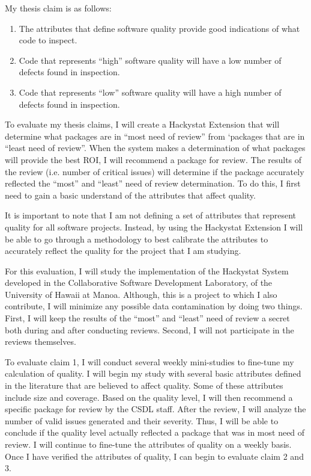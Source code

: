 \documentclass[11pt,twocolumn]{article}
\begin{document}
My thesis claim is as follows: 
\begin{enumerate}
\item The attributes that define software quality provide good indications
  of what code to inspect.
\item Code that represents ``high'' software quality will have a low number
  of defects found in inspection.
\item Code that represents ``low'' software quality will have a high number
  of defects found in inspection.
\end{enumerate}

\label{sec:evaluation}
To evaluate my thesis claims, I will create a Hackystat Extension that will
determine what packages are in ``most need of review'' from `packages that
are in ``least need of review''. When the system makes a determination of
what packages will provide the best ROI, I will recommend a package for
review. The results of the review (i.e. number of critical issues) will
determine if the package accurately reflected the ``most'' and ``least''
need of review determination.  To do this, I first need to gain a basic
understand of the attributes that affect quality.

It is important to note that I am not defining a set of attributes that
represent quality for all software projects. Instead, by using the
Hackystat Extension I will be able to go through a methodology to best
calibrate the attributes to accurately reflect the quality for the project
that I am studying.

For this evaluation, I will study the implementation of the Hackystat
System developed in the Collaborative Software Development Laboratory, of
the University of Hawaii at Manoa. Although, this is a project to which I
also contribute, I will minimize any possible data contamination by doing
two things. First, I will keep the results of the ``most'' and ``least''
need of review a secret both during and after conducting reviews. Second, I
will not participate in the reviews themselves.

To evaluate claim 1, I will conduct several weekly mini-studies to
fine-tune my calculation of quality. I will begin my study with several
basic attributes defined in the literature that are believed to affect
quality. Some of these attributes include size and coverage. Based on the
quality level, I will then recommend a specific package for review by the
CSDL staff. After the review, I will analyze the number of valid issues
generated and their severity. Thus, I will be able to conclude if the
quality level actually reflected a package that was in most need of review.
I will continue to fine-tune the attributes of quality on a weekly basis.
Once I have verified the attributes of quality, I can begin to evaluate
claim 2 and 3.
\end{document}
